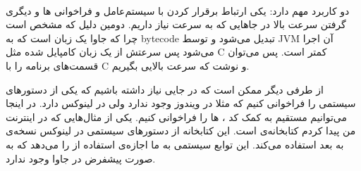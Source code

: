 \\
دو کاربرد مهم دارد:
یکی ارتباط برقرار کردن با سیستم‌عامل و فراخوانی
ها
و دیگری گرفتن سرعت بالا در جا‌هایی که به سرعت نیاز داریم.
دومین دلیل که مشخص است چرا که جاوا یک زبان است که به
bytecode
تبدیل می‌شود و توسط
JVM
آن اجرا می‌شود پس سرعتش از یک زبان کامپایل شده مثل
C
کمتر است. پس می‌توان قسمت‌های
برنامه را با
C
و
نوشت که سرعت بالایی بگیریم.

\noindent
از طرفی دیگر ممکن است که در جایی نیاز داشته باشیم که یکی از دستور‌های سیستمی را فراخوانی کنیم
که مثلا در ویندوز وجود ندارد ولی در لینوکس دارد. در اینجا می‌توانیم مستقیم به کمک کد
،
ها
را فراخوانی کنیم.
یکی از مثال‌هایی که در اینترنت من پیدا کردم کتابخانه‌ی
است. این کتابخانه از دستور‌های سیستمی
در لینوکس نسخه‌ی
به بعد استفاده می‌کند.
این توابع سیستمی به ما اجازه‌ی استفاده از
را می‌دهد که به صورت پیشفرض در جاوا وجود ندارد.



